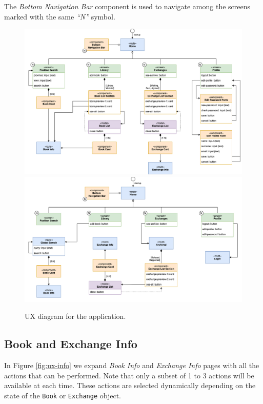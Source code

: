 The \textit{Bottom Navigation Bar} component is used to navigate among the screens marked with the same \textit{``N''} symbol.

\begin{figure}[H]
      \includegraphics{ux-diagram/ux-part-1.png}
      \includegraphics{ux-diagram/ux-part-2.png}
      \caption{UX diagram for the application.}
      \label{fig:ux-main}
\end{figure}

\subsection{Book and Exchange Info}
In Figure \ref{fig:ux-info} we expand \textit{Book Info} and \textit{Exchange Info} pages with all the actions that can be performed.
Note that only a subset of 1 to 3 actions will be available at each time.
These actions are selected dynamically depending on the state of the \texttt{Book} or \texttt{Exchange} object.


